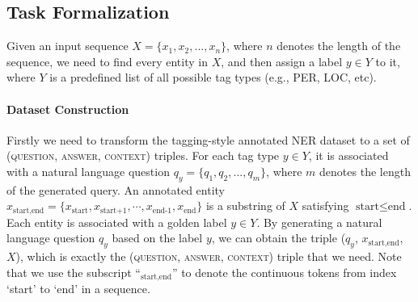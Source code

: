\documentclass[11pt,a4paper]{article}
\begin{document}
\subsection{Task Formalization}
Given an input sequence $X = \{x_1, x_2, ..., x_n\}$, where $n$ denotes the length of the sequence, we need to find every entity in $X$, and then assign a label $y \in Y$ to it, where $Y$ is a predefined list of all possible tag types (e.g., PER, LOC, etc). 

\paragraph{Dataset Construction}
Firstly we  need to transform the tagging-style annotated NER dataset  to a set of 
\textsc{(question, answer, context)} triples. 
For each tag type $y\in Y$, it is associated with a natural language question $q_y = \{q_1, q_2, ..., q_m\}$, where $m$ denotes the length of the generated query. 
 An annotated entity $x_\text{start,end}=\{x_\text{start}, x_\text{start+1},\cdots,x_\text{end-1},x_\text{end}\}$ is a substring of $X$ satisfying $\text{start}\le\text{end}$. Each entity is associated 
 with a golden label $y\in Y$. By generating a natural language question $q_y$ based on the label $y$, 
we can obtain  the triple ($q_y$, $x_\text{start,end}$, $X$), which is exactly the \textsc{(question, answer, context)} triple that we need. Note that we use the subscript ``$_\text{start,end}$'' to denote the continuous tokens from index `start' to  `end' in a sequence. 
\begin{comment}
\algrenewcommand{\algorithmicrequire}{\textbf{Input:}}
\algrenewcommand{\algorithmicensure}{\textbf{Output:}}
\newcommand{\To}{{\bf to }}
\newcommand{\IF}{{\bf if }}
\newcommand{\DO}{{\bf do }}
\newcommand{\ENDIF}{{\bf endif}}
\begin{algorithm}[t]
\small
\begin{algorithmic}[1]
\Require sequence $X=\{x_1, x_2,...,x_n\}$, 
QuestionTemplates, 
\Ensure a label sequence $\{y_1, y_2, ..., y_n\}$
\State
\State $y \gets [o]\times n$
\For {question $q_y$ in QuestionTemplates}
  \State $x_\text{start,end}$ = MRCModel($X$, $q_y$)
  \State \IF $x_\text{start,end}\neq \textsc{NULL}$  \DO \\ 
  \hspace{0.7cm}  $y_\text{start,end}$ = y
   \State \ENDIF
 \EndFor
 \State \Return $y$
\end{algorithmic}
\caption{Overview of the proposed model.}
\label{alg}
\end{algorithm}
\end{comment}
\end{document}
